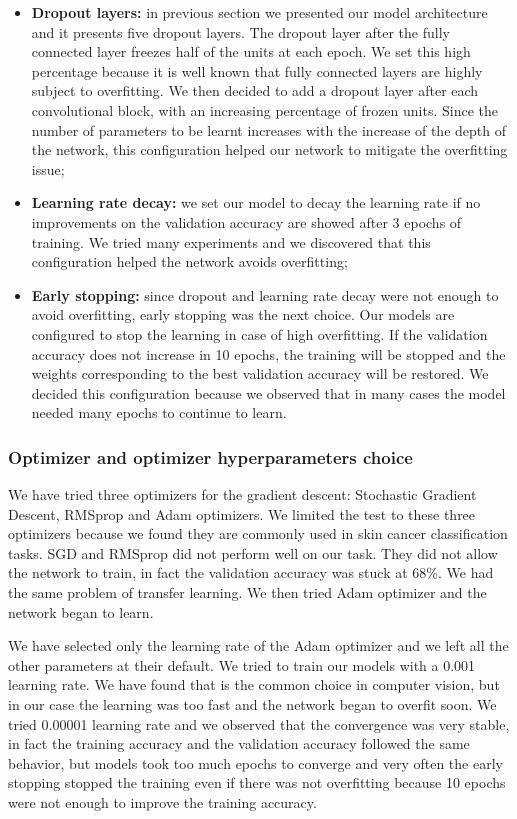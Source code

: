 			\begin{itemize}
				\item \textbf{Dropout layers:} in previous section we presented our model architecture and it presents five dropout layers. The dropout layer after the fully connected layer freezes half of the units at each epoch. We set this high percentage because it is well known that fully connected layers are highly subject to overfitting. We then decided to add a dropout layer after each convolutional block, with an increasing percentage of frozen units. Since the number of parameters to be learnt increases with the increase of the depth of the network, this configuration helped our network to mitigate the overfitting issue;
				\item \textbf{Learning rate decay:} we set our model to decay the learning rate if no improvements on the validation accuracy are showed after 3 epochs of training. We tried many experiments and we discovered that this configuration helped the network avoids overfitting;
				\item \textbf{Early stopping:} since dropout and learning rate decay were not enough to avoid overfitting, early stopping was the next choice. Our models are configured to stop the learning in case of high overfitting. If the validation accuracy does not increase in 10 epochs, the training will be stopped and the weights corresponding to the best validation accuracy will be restored. We decided this configuration because we observed that in many cases the model needed many epochs to continue to learn.
			\end{itemize}
		
		\subsubsection{Optimizer and optimizer hyperparameters choice}
			
			We have tried three optimizers for the gradient descent: Stochastic Gradient Descent, RMSprop and Adam optimizers. We limited the test to these three optimizers because we found they are commonly used in skin cancer classification tasks. SGD and RMSprop did not perform well on our task. They did not allow the network to train, in fact the validation accuracy was stuck at 68\%. We had the same problem of transfer learning. We then tried Adam optimizer and the network began to learn.
			
			\smallskip
			
			We have selected only the learning rate of the Adam optimizer and we left all the other parameters at their default. We tried to train our models with a 0.001 learning rate. We have found that is the common choice in computer vision, but in our case the learning was too fast and the network began to overfit soon. We tried 0.00001 learning rate and we observed that the convergence was very stable, in fact the training accuracy and the validation accuracy followed the same behavior, but models took too much epochs to converge and very often the early stopping stopped the training even if there was not overfitting because 10 epochs were not enough to improve the training accuracy.
			
